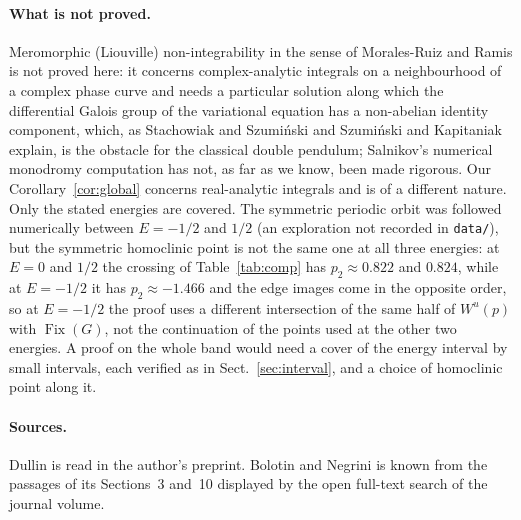 \documentclass[11pt]{article}
\theoremstyle{definition}
\newcommand{\Fix}{\operatorname{Fix}}
\begin{document}
\paragraph{What is not proved.} Meromorphic (Liouville) non-integrability in the sense of Morales-Ruiz and Ramis \cite{mrr2001, mr1999} is not proved here: it concerns complex-analytic integrals on a neighbourhood of a complex phase curve and needs a particular solution along which the differential Galois group of the variational equation has a non-abelian identity component, which, as Stachowiak and Szumi\'nski \cite{ss2015} and Szumi\'nski and Kapitaniak \cite{sk2025} explain, is the obstacle for the classical double pendulum; Salnikov's numerical monodromy computation \cite{salnikov2013} has not, as far as we know, been made rigorous. Our Corollary~\ref{cor:global} concerns real-analytic integrals and is of a different nature. Only the stated energies are covered. The symmetric periodic orbit was followed numerically between $E = -1/2$ and $1/2$ (an exploration not recorded in \texttt{data/}), but the symmetric homoclinic point is not the same one at all three energies: at $E = 0$ and $1/2$ the crossing of Table~\ref{tab:comp} has $p_2 \approx 0.822$ and $0.824$, while at $E = -1/2$ it has $p_2 \approx -1.466$ and the edge images come in the opposite order, so at $E = -1/2$ the proof uses a different intersection of the same half of $W^u(p)$ with $\Fix(G)$, not the continuation of the points used at the other two energies. A proof on the whole band would need a cover of the energy interval by small intervals, each verified as in Sect.~\ref{sec:interval}, and a choice of homoclinic point along it.

\paragraph{Sources.} Dullin \cite{dullin1994} is read in the author's preprint. Bolotin and Negrini \cite{bn1997} is known from the passages of its Sections~3 and~10 displayed by the open full-text search of the journal volume.
\end{document}
